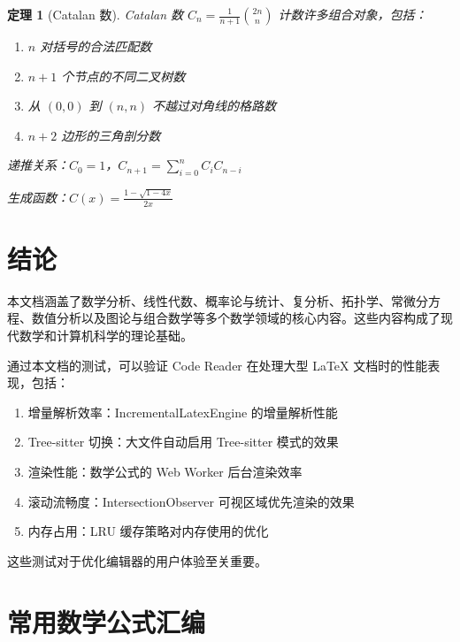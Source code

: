 \documentclass[12pt]{article}
\newtheorem{theorem}{定理}[section]
\begin{document}
\begin{theorem}[Catalan 数]
Catalan 数 $C_n = \frac{1}{n+1}\binom{2n}{n}$ 计数许多组合对象，包括：
\begin{enumerate}
\item $n$ 对括号的合法匹配数
\item $n+1$ 个节点的不同二叉树数
\item 从 $(0,0)$ 到 $(n,n)$ 不越过对角线的格路数
\item $n+2$ 边形的三角剖分数
\end{enumerate}

递推关系：$C_0 = 1$，$C_{n+1} = \sum_{i=0}^{n} C_i C_{n-i}$

生成函数：$C(x) = \frac{1 - \sqrt{1 - 4x}}{2x}$
\end{theorem}


\section{结论}

本文档涵盖了数学分析、线性代数、概率论与统计、复分析、拓扑学、常微分方程、数值分析以及图论与组合数学等多个数学领域的核心内容。这些内容构成了现代数学和计算机科学的理论基础。

通过本文档的测试，可以验证 Code Reader 在处理大型 LaTeX 文档时的性能表现，包括：

\begin{enumerate}
\item 增量解析效率：IncrementalLatexEngine 的增量解析性能
\item Tree-sitter 切换：大文件自动启用 Tree-sitter 模式的效果
\item 渲染性能：数学公式的 Web Worker 后台渲染效率
\item 滚动流畅度：IntersectionObserver 可视区域优先渲染的效果
\item 内存占用：LRU 缓存策略对内存使用的优化
\end{enumerate}

这些测试对于优化编辑器的用户体验至关重要。


\appendix

\section{常用数学公式汇编}
\end{document}
